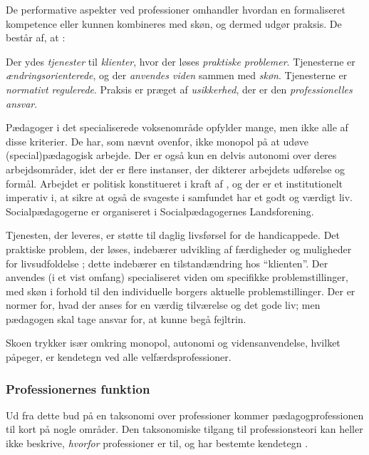 De performative aspekter ved professioner omhandler hvordan en formaliseret kompetence eller kunnen kombineres med skøn, og dermed udgør praksis. De består af, at \autocite[s 19ff]{molanderProfesjonsstudierIntroduksjon2008}:

Der ydes \textit{tjenester} til \textit{klienter},  hvor der løses \textit{praktiske problemer}.
Tjenesterne er \textit{ændringsorienterede}, og der \textit{anvendes viden} sammen med \textit{skøn}.
Tjenesterne er \textit{normativt regulerede}.
Praksis er præget af \textit{usikkerhed}, der er den \textit{professionelles ansvar}.

Pædagoger i det specialiserede voksenområde opfylder mange, men ikke alle af disse kriterier.
De har, som nævnt ovenfor, ikke monopol på at udøve (special)pædagogisk arbejde.
Der er også kun en delvis autonomi over deres arbejdsområder, idet der er flere instanser, der dikterer arbejdets udførelse og formål.
Arbejdet er politisk konstitueret i kraft af \autocite{social-ogindenrigsministerietBekendtgorelseAfLov2019}, og der er et institutionelt imperativ i, at sikre at også de svageste i samfundet har et godt og værdigt liv.
Socialpædagogerne er organiseret i Socialpædagogernes Landsforening.

Tjenesten, der leveres, er støtte til daglig livsførsel for de handicappede.
Det praktiske problem, der løses, indebærer udvikling af færdigheder og muligheder for livsudfoldelse \autocite[§ 81ff]{social-ogindenrigsministerietBekendtgorelseAfLov2019}; dette indebærer en tilstandændring hos “klienten”.
Der anvendes (i et vist omfang) specialiseret viden om specifikke problemstillinger, med skøn i forhold til den individuelle borgers aktuelle problemstillinger.
Der er normer for, hvad der anses for en værdig tilværelse og det gode liv; men pædagogen skal tage ansvar for, at kunne begå fejltrin.

Skoen trykker især omkring monopol, autonomi og vidensanvendelse, hvilket \citeauthor{frederiksenVelfaerdsprofessionerMellemOmsorg2017} påpeger, er kendetegn ved alle velfærdsprofessioner.

\subsubsection{Professionernes funktion}
Ud fra dette bud på en taksonomi over professioner kommer pædagogprofessionen til kort på nogle områder.
Den taksonomiske tilgang til professionsteori kan heller ikke beskrive, \textit{hvorfor} professioner er til, og har bestemte kendetegn \autocite[s. 450]{frederiksenVelfaerdsprofessionerMellemOmsorg2017}.

